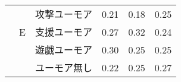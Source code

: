 \begin{table}
\begin{center}
\begin{tabular}{|c|c|c|p{6em}|p{6em}|p{6em}|}
 &  & 攻撃ユーモア & \hspace{2zw}0.21 & \hspace{2zw}0.18 & \hspace{2zw}0.25 \\\cline{3-6}
 & E & 支援ユーモア & \hspace{2zw}0.27 & \hspace{2zw}0.32 & \hspace{2zw}0.24 \\\cline{3-6}
 &  & 遊戯ユーモア & \hspace{2zw}0.30 & \hspace{2zw}0.25 & \hspace{2zw}0.25 \\\cline{3-6}
 &  & ユーモア無し & \hspace{2zw}0.22 & \hspace{2zw}0.25 & \hspace{2zw}0.27 \\\hline
\end{tabular}
\end{center}
\end{table}




